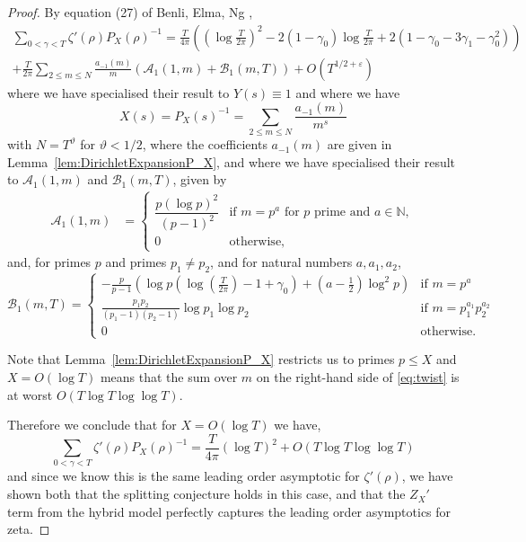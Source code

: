 \documentclass[12pt,a4paper,reqno]{amsart}
\theoremstyle{remark}
\numberwithin{equation}{section}
\begin{document}
\begin{proof}
By equation (27) of Benli, Elma, Ng \cite{BEN23},
    \begin{multline}\label{eq:twist}
    \sum_{0<\gamma<T} \zeta'(\rho) P_X(\rho)^{-1} = \frac{T}{4\pi} \left(\left(\log\frac{T}{2\pi}\right)^2 - 2(1-\gamma_0)\log\frac{T}{2\pi} +2(1-\gamma_0- 3\gamma_1 - \gamma_0^2) \right) \\
    +\frac{T}{2\pi} \sum_{2\leq m\leq N} \frac{a_{-1}(m)}{m} \left(\mathcal{A}_1(1,m) + \mathcal{B}_1(m,T) \right) + O\left(T^{1/2+\varepsilon}\right)
    \end{multline}
where we have specialised their result to $Y(s) \equiv 1$ and where we have 
    \[
    X(s) = P_X(s)^{-1} = \sum_{2\leq m\leq N} \frac{a_{-1}(m)}{m^s}
    \]
with $N=T^\vartheta$ for $\vartheta <1/2$, where the coefficients $a_{-1}(m)$ are given in Lemma~\ref{lem:DirichletExpansionP_X}, and where we have specialised their result to $\mathcal{A}_1(1,m)$ and $\mathcal{B}_1(m,T)$, given by 
\begin{align*}
    \mathcal{A}_1(1,m) &=
    \begin{cases}
        \dfrac{p (\log p)^2}{(p-1)^2} & \text{if } m = p^a \text{ for $p$ prime and } a \in \mathbb{N}, \\
        0 & \text{otherwise},
    \end{cases} 
\end{align*}
and, for primes $p$ and primes $p_1 \neq p_2$, and for natural numbers $a,a_1,a_2$,
\begin{equation*}
\mathcal{B}_1(m,T)= 
        \begin{cases}
        \displaystyle
        -\frac{p}{p - 1} \left( \log p \left( \log\left( \frac{T}{2\pi} \right) - 1 + \gamma_0 \right) + \left(a - \frac{1}{2} \right) \log^2 p \right)
        & \text{if } m = p^a \\[2ex]
        \displaystyle
        \frac{p_1 p_2}{(p_1 - 1)(p_2 - 1)} \log p_1 \log p_2
        &\text{if } m = p_1^{a_1} p_2^{a_2}\\[2ex]
        \displaystyle
        0 & \text{otherwise}.
\end{cases}
\end{equation*}

Note that Lemma~\ref{lem:DirichletExpansionP_X} restricts us to primes $p\leq X$ and $X = O (\log T)$ means that the sum over $m$ on the right-hand side of \eqref{eq:twist} is at worst $O(T \log T \log\log T)$.

Therefore we conclude that for $X = O\left(\log T\right)$ we have,
\[
\sum_{0<\gamma<T} \zeta'(\rho) P_X(\rho)^{-1} = \frac{T}{4\pi} (\log T)^2 + O(T\log T \log\log T)
\]
and since we know this is the same leading order asymptotic for $\zeta'(\rho)$, we have shown both that the splitting conjecture holds in this case, and that the $Z_X'$ term from the hybrid model perfectly captures the leading order asymptotics for zeta.
\end{proof}
\end{document}
